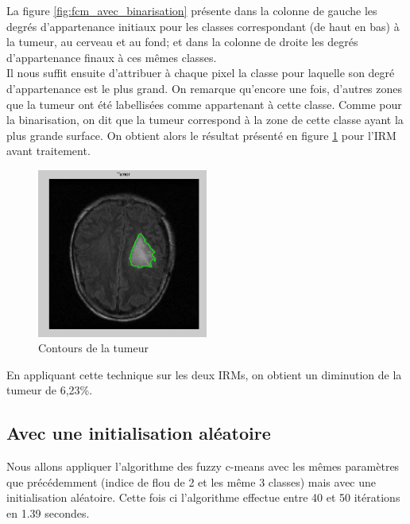 		La figure \ref{fig:fcm_avec_binarisation} présente dans la colonne de gauche les degrés d'appartenance initiaux pour les classes correspondant (de haut en bas) à la tumeur, au cerveau et au fond; et dans la colonne de droite les degrés d'appartenance finaux à ces mêmes classes.\\

		Il nous suffit ensuite d'attribuer à chaque pixel la classe pour laquelle son degré d'appartenance est le plus grand. On remarque qu'encore une fois, d'autres zones que la tumeur ont été labellisées comme appartenant à cette classe. Comme pour la binarisation, on dit que la tumeur correspond à la zone de cette classe ayant la plus grande surface. On obtient alors le résultat présenté en figure \ref{fig:fcm_tumeur} pour l'IRM avant traitement. 

		\begin{figure}[H]
			\centering
			\includegraphics[width=0.5\textwidth]{images/2-tumeur.png}
			\caption{Contours de la tumeur}
			\label{fig:fcm_tumeur}
		\end{figure}

		En appliquant cette technique sur les deux IRMs, on obtient un diminution de la tumeur de 6,23\%.

	\subsection{Avec une initialisation aléatoire} %
	\label{ssub:avec_une_initialisation_al_atoire}
		Nous allons appliquer l'algorithme des fuzzy c-means avec les mêmes paramètres que précédemment (indice de flou de 2 et les même 3 classes) mais avec une initialisation aléatoire. Cette fois ci l'algorithme effectue entre 40 et 50 itérations en 1.39 secondes. \\

